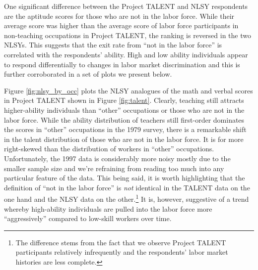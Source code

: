 \documentclass[onehalfspacing,11pt]{article}
\begin{document}
	One significant difference between the Project TALENT and NLSY respondents are the aptitude scores for those who are not in the labor force. While their average score was higher than the average score of labor force participants in non-teaching occupations in Project TALENT, the ranking is reversed in the two NLSYs. This suggests that the exit rate from ``not in the labor force'' is correlated with the respondents' ability. High and low ability individuals appear to respond differentially to changes in labor market discrimination and this is further corroborated in a set of plots we present below. 
	
	Figure \ref{fig:nlsy_by_occ} plots the NLSY analogues of the math and verbal scores in Project TALENT shown in Figure \ref{fig:talent}. Clearly, teaching still attracts higher-ability individuals than ``other'' occupations or those who are not in the labor force. While the ability distribution of teachers still first-order dominates the scores in ``other'' occupations in the 1979 survey, there is a remarkable shift in the talent distribution of those who are not in the labor force. It is for more right-skewed than the distribution of workers in ``other'' occupations. Unfortunately, the 1997 data is considerably more noisy mostly due to the smaller sample size and we're refraining from reading too much into any particular feature of the data. This being said, it is worth highlighting that the definition of ``not in the labor force'' is {\it not} identical in the TALENT data on the one hand and the NLSY data on the other.\footnote{The difference stems from the fact that we observe Project TALENT participants relatively infrequently and the respondents' labor market histories are less complete.} It is, however, suggestive of a trend whereby high-ability individuals are pulled into the labor force more ``aggressively'' compared to low-skill workers over time.
	
\end{document}
